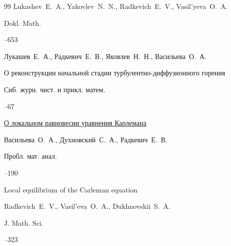 \begin{thebibliography}{99}
\by Lukashev~E.~A., Yakovlev~N.~N., Radkevich~E.~V., Vasil'yeva~O.~A.

\jour Dokl. Math.




--653








\by Лукашев~Е.~А., Радкевич~Е.~В., Яковлев~Н.~Н., Васильева~О.~А.

\paper О реконструкции начальной стадии турбулентно-диффузионного горения

\jour Сиб. журн. чист. и прикл. матем.




--67








\paper \href{https://elibrary.ru/item.asp?id=28111054}{О локальном равновесии уравнения Карлемана}

\by Васильева~О.~А., Духновский~С.~А., Радкевич~Е.~В.

\jour Пробл. мат. анал.



--190

\transl

\paper Local equilibrium of the Carleman equation

\by Radkevich~E.~V., Vasil'eva~O.~A., Dukhnovskii~S.~A.

\jour J. Math. Sci. 




--323


\end{thebibliography}
